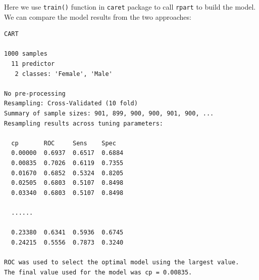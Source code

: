 \documentclass[12pt,]{krantz}
\makeatletter
\newenvironment{Shaded}{\begin{snugshade}}{\end{snugshade}}
\newcommand{\CommentTok}[1]{\textcolor[rgb]{0.37,0.37,0.37}{\textit{#1}}}
\newcommand{\DataTypeTok}[1]{\textcolor[rgb]{0.27,0.27,0.27}{#1}}
\newcommand{\KeywordTok}[1]{\textcolor[rgb]{0.27,0.27,0.27}{\textbf{#1}}}
\newcommand{\NormalTok}[1]{#1}
\newcommand{\OperatorTok}[1]{\textcolor[rgb]{0.43,0.43,0.43}{\textbf{#1}}}
\newcommand{\StringTok}[1]{\textcolor[rgb]{0.5,0.5,0.5}{#1}}
\newenvironment{kframe}{%
\medskip{}
\setlength{\fboxsep}{.8em}
 \def\at@end@of@kframe{}%
 \ifinner\ifhmode%
  \def\at@end@of@kframe{\end{minipage}}%
  \begin{minipage}{\columnwidth}%
 \fi\fi%
 \def\FrameCommand##1{\hskip\@totalleftmargin \hskip-\fboxsep
 \colorbox{shadecolor}{##1}\hskip-\fboxsep
     \hskip-\linewidth \hskip-\@totalleftmargin \hskip\columnwidth}%
 \MakeFramed {\advance\hsize-\width
   \@totalleftmargin\z@ \linewidth\hsize
   \@setminipage}}%
 {\par\unskip\endMakeFramed%
 \at@end@of@kframe}
\renewenvironment{Shaded}{\begin{kframe}}{\end{kframe}}
\makeatother
\begin{document}
\begin{Shaded}
\end{Shaded}

Here we use \texttt{train()} function in \texttt{caret} package to call \texttt{rpart} to build the model. We can compare the model results from the two approaches:

\begin{verbatim}
CART 

1000 samples
  11 predictor
   2 classes: 'Female', 'Male' 

No pre-processing
Resampling: Cross-Validated (10 fold) 
Summary of sample sizes: 901, 899, 900, 900, 901, 900, ... 
Resampling results across tuning parameters:

  cp       ROC     Sens    Spec  
  0.00000  0.6937  0.6517  0.6884
  0.00835  0.7026  0.6119  0.7355
  0.01670  0.6852  0.5324  0.8205
  0.02505  0.6803  0.5107  0.8498
  0.03340  0.6803  0.5107  0.8498
  
  ......

  0.23380  0.6341  0.5936  0.6745
  0.24215  0.5556  0.7873  0.3240

ROC was used to select the optimal model using the largest value.
The final value used for the model was cp = 0.00835.
\end{verbatim}
\end{document}
